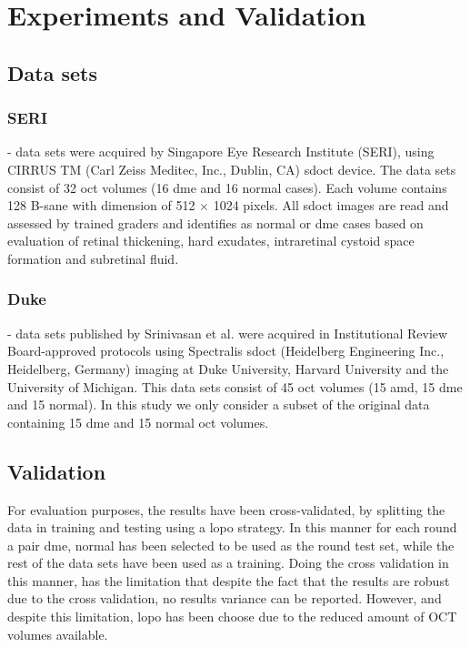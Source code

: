 
\section{Experiments and Validation }
\subsection{Data sets}
\subsubsection{SERI} - data sets were acquired by Singapore Eye Research Institute (SERI), using CIRRUS TM (Carl Zeiss Meditec, Inc., Dublin, CA) \ac{sdoct} device. The data sets consist of 32 \ac{oct} volumes (16 \ac{dme} and 16 normal cases). Each volume contains 128 B-sane with  dimension of 512 $\times$ 1024 pixels.  All \ac{sdoct} images are read and assessed by trained graders and identifies as normal or \ac{dme} cases based on evaluation of retinal thickening, hard exudates, intraretinal cystoid space formation and subretinal fluid.


\subsubsection{Duke} - data sets published by Srinivasan et al. \cite{Srinivasan2014} were acquired in Institutional Review Board-approved protocols using Spectralis \ac{sdoct} (Heidelberg Engineering Inc., Heidelberg, Germany) imaging at Duke University, Harvard University and the University of Michigan. This data sets consist of 45 \ac{oct} volumes (15 \ac{amd}, 15 \ac{dme} and 15 normal). In this study we only consider a subset of the original data containing 15 \ac{dme} and 15 normal \ac{oct} volumes.

\subsection{Validation}
For evaluation purposes, the results have been cross-validated, by splitting the data in training and testing using a \ac{lopo} strategy. In this manner for each round a pair \ac{dme}, normal has been selected to be used as the round test set, while the rest of the data sets have been used as a training. Doing the cross validation in this manner, has the limitation that despite the fact that the results are robust due to the cross validation, no results variance can be reported. However, and despite this limitation, \ac{lopo} has been choose due to the reduced amount of OCT volumes available.

